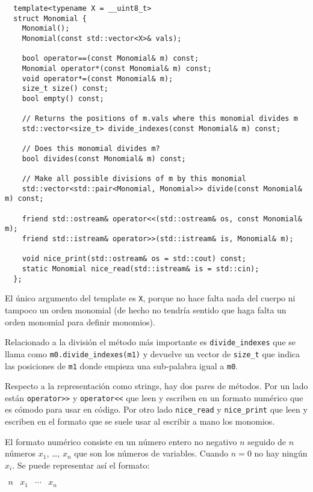 \documentclass[12pt]{report}
\theoremstyle{customstyle}
\theoremstyle{factstyle}
\begin{document}
\begin{verbatim}
  template<typename X = __uint8_t>
  struct Monomial {
    Monomial();
    Monomial(const std::vector<X>& vals);

    bool operator==(const Monomial& m) const;
    Monomial operator*(const Monomial& m) const;
    void operator*=(const Monomial& m);
    size_t size() const;
    bool empty() const;

    // Returns the positions of m.vals where this monomial divides m
    std::vector<size_t> divide_indexes(const Monomial& m) const;

    // Does this monomial divides m?
    bool divides(const Monomial& m) const;

    // Make all possible divisions of m by this monomial
    std::vector<std::pair<Monomial, Monomial>> divide(const Monomial& m) const;

    friend std::ostream& operator<<(std::ostream& os, const Monomial& m);
    friend std::istream& operator>>(std::istream& is, Monomial& m);

    void nice_print(std::ostream& os = std::cout) const;
    static Monomial nice_read(std::istream& is = std::cin);
  };
\end{verbatim}

El único argumento del template es \texttt{X}, porque no hace falta nada del cuerpo ni tampoco un orden monomial (de hecho no tendría sentido que haga falta un orden monomial para definir monomios).

Relacionado a la división el método más importante es \texttt{divide\_indexes} que se llama como \texttt{m0.divide\_indexes(m1)} y devuelve un vector de \texttt{size\_t} que indica las posiciones de \texttt{m1} donde empieza una sub-palabra igual a \texttt{m0}.

Respecto a la representación como strings, hay dos pares de métodos. Por un lado están \texttt{operator>>} y \texttt{operator<<} que leen y escriben en un formato numérico que es cómodo para usar en código. Por otro lado \texttt{nice\_read} y \texttt{nice\_print} que leen y escriben en el formato que se suele usar al escribir a mano los monomios.

El formato numérico consiste en un número entero no negativo $n$ seguido de $n$ números $x_1$, …, $x_n$ que son los números de variables. Cuando $n = 0$ no hay ningún $x_i$. Se puede representar así el formato:

$\begin{array}{llll} n & x_1 & ⋯ & x_n \end{array}$
\end{document}
